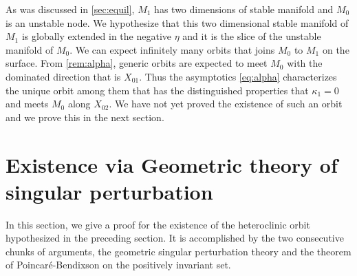 \documentclass[a4paper,11pt]{article}
\begin{document}
As was discussed in \ref{sec:equil}, $M_1$ has two dimensions of stable manifold and $M_0$ is an unstable node. We hypothesize that this two dimensional stable manifold of $M_1$ is globally extended in the negative $\eta$ and it is the slice of the unstable manifold of $M_0$. We can expect infinitely many orbits that joins $M_0$ to $M_1$ on the surface. From \ref{rem:alpha}, generic orbits are expected to meet $M_0$ with the dominated direction that is $X_{01}$. Thus the asymptotics \eqref{eq:alpha} characterizes the unique orbit among them that has the distinguished properties that $\kappa_1=0$ and meets $M_0$ along $X_{02}$. We have not yet proved the existence of such an orbit and we prove this in the next section.

\section{Existence via Geometric theory of singular perturbation}
In this section, we give a proof for the existence of the heteroclinic orbit hypothesized in the preceding section. It is accomplished by the two consecutive chunks of arguments, the geometric singular perturbation theory and the theorem of Poincar\'e-Bendixson on the positively invariant set.
\end{document}
